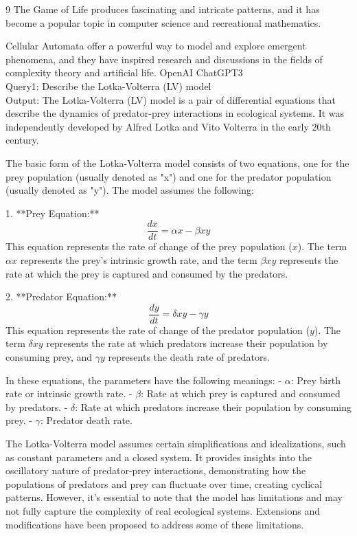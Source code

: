 \documentclass[CTeX = true]{mcmthesis}  %
\begin{document}
\begin{ReportAiUse}{9}
The Game of Life produces fascinating and intricate patterns, and it has become a popular topic in computer science and recreational mathematics.

Cellular Automata offer a powerful way to model and explore emergent phenomena, and they have inspired research and discussions in the fields of complexity theory and artificial life.
OpenAI ChatGPT3\\
Query1: Describe the Lotka-Volterra (LV) model\\
Output: The Lotka-Volterra (LV) model is a pair of differential equations that describe the dynamics of predator-prey interactions in ecological systems. It was independently developed by Alfred Lotka and Vito Volterra in the early 20th century.

The basic form of the Lotka-Volterra model consists of two equations, one for the prey population (usually denoted as "x") and one for the predator population (usually denoted as "y"). The model assumes the following:

1. **Prey Equation:**
   \[ \frac{dx}{dt} = \alpha x - \beta xy \]
   This equation represents the rate of change of the prey population (\(x\)). The term \(\alpha x\) represents the prey's intrinsic growth rate, and the term \(\beta xy\) represents the rate at which the prey is captured and consumed by the predators.

2. **Predator Equation:**
   \[ \frac{dy}{dt} = \delta xy - \gamma y \]
   This equation represents the rate of change of the predator population (\(y\)). The term \(\delta xy\) represents the rate at which predators increase their population by consuming prey, and \(\gamma y\) represents the death rate of predators.

In these equations, the parameters have the following meanings:
- \(\alpha\): Prey birth rate or intrinsic growth rate.
- \(\beta\): Rate at which prey is captured and consumed by predators.
- \(\delta\): Rate at which predators increase their population by consuming prey.
- \(\gamma\): Predator death rate.

The Lotka-Volterra model assumes certain simplifications and idealizations, such as constant parameters and a closed system. It provides insights into the oscillatory nature of predator-prey interactions, demonstrating how the populations of predators and prey can fluctuate over time, creating cyclical patterns. However, it's essential to note that the model has limitations and may not fully capture the complexity of real ecological systems. Extensions and modifications have been proposed to address some of these limitations.

\end{ReportAiUse}
\end{document}
